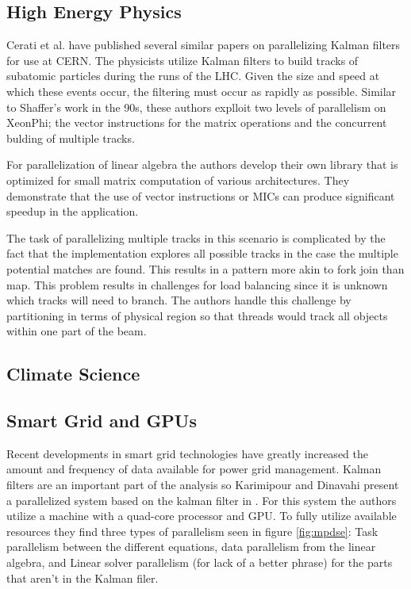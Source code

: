 \documentclass[11pt]{article}
\begin{document}
\subsection{High Energy Physics}
Cerati et al. have published several similar papers \cite{cerati2015kalman,cerati2016kalman,cerati2015traditional} on parallelizing Kalman filters for use at CERN. The physicists utilize Kalman filters to build tracks of subatomic particles during the runs of the LHC. Given the size and speed at which these events occur, the filtering must occur as rapidly as possible. Similar to Shaffer's work in the 90s, these authors explloit two levels of parallelism on XeonPhi; the vector instructions for the matrix operations and the concurrent bulding of multiple tracks.

For parallelization of linear algebra the authors develop their own library that is optimized for small matrix computation of various architectures. They demonstrate that the use of vector instructions or MICs can produce significant speedup in the application.

The task of parallelizing multiple tracks in this scenario is complicated by the fact that the implementation explores all possible tracks in the case the multiple potential matches are found. This results in a pattern more akin to fork join than map. This problem results in challenges for load balancing since it is unknown which tracks will need to branch. The authors handle this challenge by partitioning in terms of physical region so that threads would track all objects within one part of the beam.


\subsection{Climate Science}
\cite{menard2000assimilation1,menard2000assimilation2,lyster1997parallel}

\subsection{Smart Grid and GPUs}
Recent developments in smart grid technologies have greatly increased the amount and frequency of data available for power grid management. Kalman filters are an important part of the analysis so Karimipour and Dinavahi present a parallelized system based on the kalman filter in \cite{karimipour2015extended}. For this system the authors utilize a machine with a quad-core processor and GPU. To fully utilize available resources they find three types of parallelism seen in figure \ref{fig:mpdse}: Task parallelism between the different equations, data parallelism from the linear algebra, and Linear solver parallelism (for lack of a better phrase) for the parts that aren't in the Kalman filer.
\end{document}
